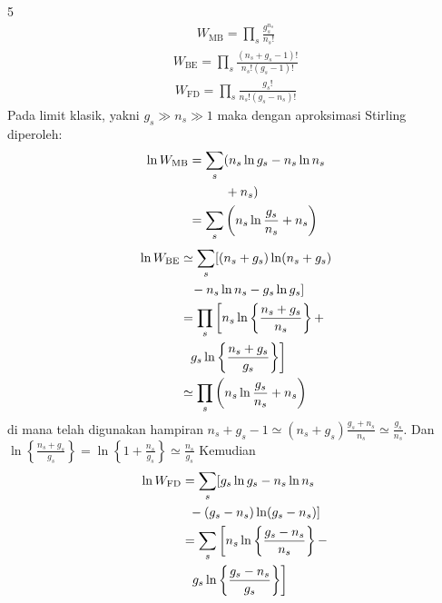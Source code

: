\documentclass[a4paper  , 6 pt]{article}
\begin{document}
\begin{tiny}
\begin{multicols} {5}
\begin{align}
W_\mathrm{MB} = \prod_s  \frac{g_s^{n_s}}{n_s !} \label{boltzmann-semiklasik}
\end{align}
\begin{align}
W_\mathrm{BE} = \prod_s \frac{(n_s + g_s -1)!}{n_s ! (g_s - 1)!} 
\end{align}
\begin{align}
W_\mathrm{FD} = \prod_s \frac{g_s! }{n_s ! (g_s - n_s )!} 
\end{align}
Pada limit klasik, yakni $g_s \gg n_s \gg 1$ maka dengan aproksimasi Stirling diperoleh:
\begin{align}
\ln W_\mathrm{MB}& = \sum_s (n_s \ln g_s  - n_s \ln n_s
 \nonumber \\ 
 &\hspace{1 cm } 
 + n_s ) \nonumber \\
& = \sum_s \left( n_s \ln \frac{g_s }{n_s } + n_s  \right)
\end{align}
\begin{align}
\ln W_\mathrm{BE} &\simeq \sum_s [ (n_s + g_s )\ln (n_s + g_s )\nonumber \\ 
&  \hspace{0.3 cm } - n_s \ln n_s - g_s \ln g_s ] \nonumber \\
&  = \prod_s \left [ n_s \ln \left \lbrace  \frac{n_s + g_s }{n_s }\right \rbrace + \right. \nonumber \\
& \hspace{0.2 cm } \left. g_s \ln \left \lbrace  \frac{n_s + g_s}{g_s }\right \rbrace \right ] \nonumber \\
& \simeq \prod_s \left( n_s \ln \frac{g_s }{n_s } + n_s \right)
\end{align}
di mana telah  digunakan hampiran $n_s + g_s - 1 \simeq (n_s + g_s ) \frac{g_s + n_s }{n_s } \simeq \frac{g_s }{n_s }$. Dan $\ln \left \lbrace \frac{n_s + g_s }{g_s} \right \rbrace  = \ln \left \lbrace  1 + \frac{n_s }{g_s } 
\right \rbrace \simeq \frac{n_s }{g_s }$ \newline  Kemudian
\begin{align}
\ln W_\mathrm{FD}& = \sum_s [ g_s \ln g_s - n_s \ln n_s  \nonumber \\
& \hspace{0.2 cm } - (g_s - n_s )\ln (g_s -n_s) ] \nonumber \\
& = \sum_s \left [ n_s \ln \left \lbrace  \frac{g_s - n_s }{n_s }\right \rbrace   - \right. \nonumber
 \\
& \hspace{0.2 cm } \left. g_s \ln \left \lbrace \frac{g_s - n_s }{g_s } \right \rbrace \right ] \nonumber \\

\end{align}
\end{multicols}
\end{tiny}
\end{document}
